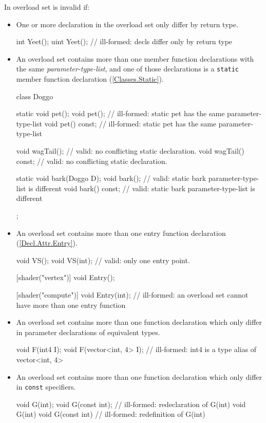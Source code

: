 \p In overload set is invalid if:
\begin{itemize}
  \item One or more declaration in the overload set only differ by return type.
\begin{HLSL}
int Yeet();
uint Yeet(); // ill-formed: decls differ only by return type
\end{HLSL}

  \item An overload set contains more than one member function declarations with
  the same \textit{parameter-type-list}, and one of those declarations is a
  \texttt{static} member function declaration (\ref{Classes.Static}).
\begin{HLSL}
class Doggo {
  static void pet();
  void pet();              // ill-formed: static pet has the same parameter-type-list
  void pet() const;        // ill-formed: static pet has the same parameter-type-list

  void wagTail();          // valid: no conflicting static declaration.
  void wagTail() const;    // valid: no conflicting static declaration.

  static void bark(Doggo D);
  void bark();             // valid: static bark parameter-type-list is different
  void bark() const;       // valid: static bark parameter-type-list is different
};
\end{HLSL}

  \item An overload set contains more than one entry function declaration
  (\ref{Decl.Attr.Entry}).
\begin{HLSL}
void VS();
void VS(int);              // valid: only one entry point.

[shader("vertex")]
void Entry();

[shader("compute")]
void Entry(int);           // ill-formed: an overload set cannot have more than one entry function
\end{HLSL}

  \item An overload set contains more than one function declaration which only
  differ in parameter declarations of equivalent types.
\begin{HLSL}
void F(int4 I);
void F(vector<int, 4> I);  // ill-formed: int4 is a type alias of vector<int, 4>
\end{HLSL}

  \item An overload set contains more than one function declaration which only
  differ in \texttt{const} specifiers.
\begin{HLSL}
void G(int);
void G(const int);         // ill-formed: redeclaration of G(int)
void G(int) {}
void G(const int) {}       // ill-formed: redefinition of G(int)
\end{HLSL}


\end{itemize}
